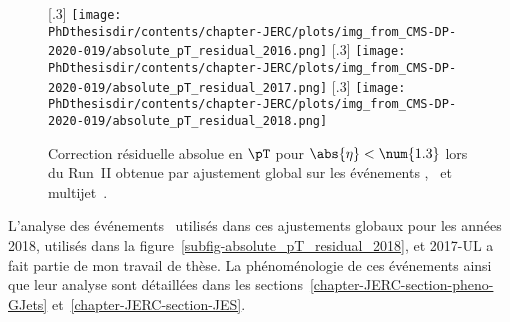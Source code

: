 \begin{figure}[h]
\centering
{}[.3\textwidth]
{\texttt{[image: \\PhDthesisdir/contents/chapter-JERC/plots/img\_from\_CMS-DP-2020-019/absolute\_pT\_residual\_2016.png]}}
\hfill
{}[.3\textwidth]
{\texttt{[image: \\PhDthesisdir/contents/chapter-JERC/plots/img\_from\_CMS-DP-2020-019/absolute\_pT\_residual\_2017.png]}}
\hfill
{}[.3\textwidth]
{\texttt{[image: \\PhDthesisdir/contents/chapter-JERC/plots/img\_from\_CMS-DP-2020-019/absolute\_pT\_residual\_2018.png]}}
\caption[Correction résiduelle absolue en $\pT$ pour $\abs{\eta}<\num{1.3}$ lors du Run~II.]{Correction résiduelle absolue en $\pT$ pour $\abs{\eta}<\num{1.3}$ lors du Run~II obtenue par ajustement global sur les événements \Gjets, \Zjets\ et multijet~\cite{CMS-DP-2020-019}.}
\label{fig-L3ResAbs_RunII}
\end{figure}
\par L'analyse des événements \Gjets\ utilisés dans ces ajustements globaux pour les années 2018, utilisés dans la figure~\ref{subfig-absolute_pT_residual_2018}, et 2017-UL a fait partie de mon travail de thèse.
La phénoménologie de ces événements ainsi que leur analyse sont détaillées dans les sections~\ref{chapter-JERC-section-pheno-GJets} et~\ref{chapter-JERC-section-JES}.
\newpage
